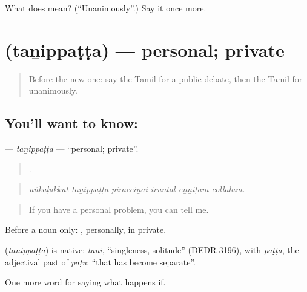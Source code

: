 \begin{tcolorbox}[breakable,colback=teal!4,colframe=teal!35!black,title={Before you move on}]
What does  mean? (\textquotedblleft{}Unanimously\textquotedblright{}.) Say it once more.
\end{tcolorbox}
\section[\texorpdfstring{\ta{தனிப்பட்ட} (taṉippaṭṭa)}{தனிப்பட்ட (taṉippaṭṭa)}]{ (taṉippaṭṭa) — personal; private}

\label{lesson:TA-C397-tanippatta}



\begin{quote}
Before the new one: say the Tamil for a public debate, then the Tamil for unanimously.
\end{quote}

\subsection*{You'll want to know: }
\textbf{} — \emph{taṉippaṭṭa} — \textquotedblleft{}personal; private\textquotedblright{}.

\begin{quote}
     .
\end{quote}

\begin{quote}
\emph{uṅkaḷukkut taṉippaṭṭa piracciṉai iruntāl eṉṉiṭam collalām.}
\end{quote}

\begin{quote}
If you have a personal problem, you can tell me.
\end{quote}

Before a noun only:  , personally, in private.

\begin{cousinweb}
\textbf{} (\emph{taṉippaṭṭa}) is native: \emph{taṉi}, \textquotedblleft{}singleness, solitude\textquotedblright{} (DEDR 3196), with \emph{paṭṭa}, the adjectival past of \emph{paṭu}: \textquotedblleft{}that has become separate\textquotedblright{}.
\end{cousinweb}

\begin{grammarlens}[title={What you've built}]
One more word for saying what happens if.
\end{grammarlens}

